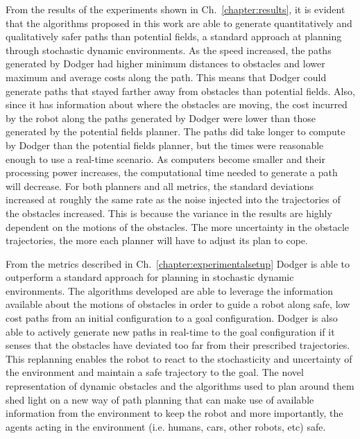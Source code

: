 From the results of the experiments shown in Ch.~\ref{chapter:results}, it is
evident that the algorithms proposed in this work are able to generate
quantitatively and qualitatively safer paths than potential fields, a standard
approach at planning through stochastic dynamic environments. As the speed
increased, the paths generated by Dodger had higher minimum distances to
obstacles and lower maximum and average costs along the path. This means that
Dodger could generate paths that stayed farther away from obstacles than
potential fields. Also, since it has information about where the obstacles are
moving, the cost incurred by the robot along the paths generated by Dodger were
lower than those generated by the potential fields planner. The paths did take
longer to compute by Dodger than the potential fields planner, but the times
were reasonable enough to use a real-time scenario. As computers become smaller
and their processing power increases, the computational time needed to generate
a path will decrease. For both planners and all metrics, the standard
deviations increased at roughly the same rate as the noise injected into the
trajectories of the obstacles increased. This is because the variance in the
results are highly dependent on the motions of the obstacles. The more
uncertainty in the obstacle trajectories, the more each planner will have to
adjust its plan to cope.

From the metrics described in Ch.~\ref{chapter:experimentalsetup} Dodger is
able to outperform a standard approach for planning in stochastic dynamic
environments. The algorithms developed are able to leverage the information
available about the motions of obstacles in order to guide a robot along safe,
low cost paths from an initial configuration to a goal configuration. Dodger is
also able to actively generate new paths in real-time to the goal configuration
if it senses that the obstacles have deviated too far from their prescribed
trajectories. This replanning enables the robot to react to the stochasticity
and uncertainty of the environment and maintain a safe trajectory to the goal.
The novel representation of dynamic obstacles and the algorithms used to plan
around them shed light on a new way of path planning that can make use of
available information from the environment to keep the robot and more
importantly, the agents acting in the environment (i.e. humans, cars, other
robots, etc) safe.


